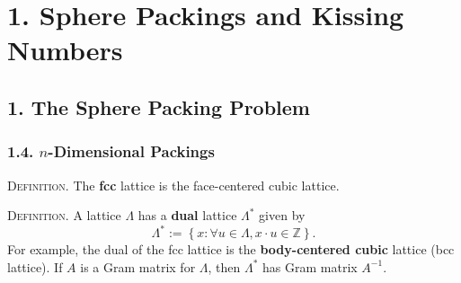 \documentclass{article}
\newcommand{\Z}{\mathbb{Z}}
\renewcommand{\i}{^{-1}}
\newcommand{\set}[1]{\left\{ #1 \right\}}
\newcommand{\header}[1]{\noindent\textsc{#1.} }
\begin{document}
\section*{1. Sphere Packings and Kissing Numbers}

\subsection*{1. The Sphere Packing Problem}

\subsubsection*{1.4. $n$-Dimensional Packings}

\header{Definition}
The \textbf{fcc} lattice is the face-centered cubic lattice.

\header{Definition}
A lattice $\Lambda$ has a \textbf{dual} lattice $\Lambda^*$ given by
$$ \Lambda^* := \set{ x : \forall u \in \Lambda, x \cdot u \in \Z }. $$
For example, the dual of the fcc lattice is the \textbf{body-centered cubic} lattice (bcc lattice).
If $A$ is a Gram matrix for $\Lambda$, then $\Lambda^*$ has Gram matrix $A\i$.
\end{document}
